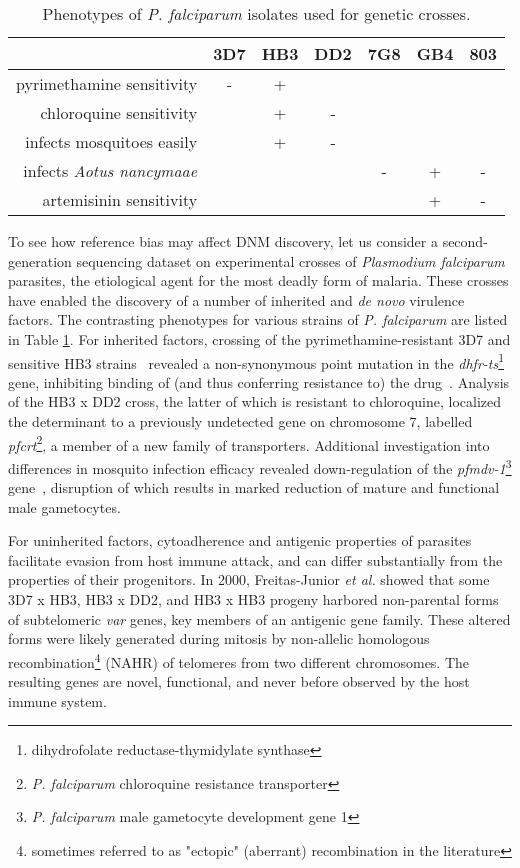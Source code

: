 \begin{table}[]
\centering
\caption{Phenotypes of \textit{P. falciparum} isolates used for genetic crosses.}
\label{tb:pf_phenotypes}
\begin{tabular}{@{}rcccccc@{}}
\toprule
                                 & 3D7 & HB3 & DD2 & 7G8 & GB4 & 803 \\
\midrule
pyrimethamine sensitivity        & -   & +   &     &     &     &     \\
chloroquine sensitivity          &     & +   & -   &     &     &     \\
infects mosquitoes easily        &     & +   & -   &     &     &     \\
infects \textit{Aotus nancymaae} &     &     &     & -   & +   & -   \\
artemisinin sensitivity          &     &     &     &     & +   & -   \\
\bottomrule
\end{tabular}
\end{table}

To see how reference bias may affect DNM discovery, let us consider a second-generation sequencing dataset on experimental crosses of \textit{Plasmodium falciparum} parasites, the etiological agent for the most deadly form of malaria.  These crosses have enabled the discovery of a number of inherited and \textit{de novo} virulence factors.  The contrasting phenotypes for various strains of \textit{P. falciparum} are listed in Table \ref{tb:pf_phenotypes}.  For inherited factors, crossing of the pyrimethamine-resistant 3D7 and sensitive HB3 strains~\cite{Walliker:1987cv} revealed a non-synonymous point mutation in the \textit{dhfr-ts}\footnote{dihydrofolate reductase-thymidylate synthase} gene, inhibiting binding of (and thus conferring resistance to) the drug~\cite{Peterson:1988wt}.  Analysis of the HB3 x DD2 cross\cite{Wellems:1990eg}, the latter of which is resistant to chloroquine, localized the determinant to a previously undetected gene on chromosome $7$, labelled \textit{pfcrt}\footnote{\textit{P. falciparum} chloroquine resistance transporter}, a member of a new family of transporters.  Additional investigation into differences in mosquito infection efficacy revealed down-regulation of the \textit{pfmdv-1}\footnote{\textit{P. falciparum} male gametocyte development gene 1} gene~\cite{Vaidya:1995up,Furuya:2005jn}, disruption of which results in marked reduction of mature and functional male gametocytes.

For uninherited factors, cytoadherence and antigenic properties of parasites facilitate evasion from host immune attack, and can differ substantially from the properties of their progenitors.  In 2000, Freitas-Junior \textit{et al.} showed that some 3D7 x HB3, HB3 x DD2, and HB3 x HB3 progeny harbored non-parental forms of subtelomeric \textit{var} genes, key members of an antigenic gene family\cite{FreitasJunior:2000cp}.  These altered forms were likely generated during mitosis by non-allelic homologous recombination\footnote{sometimes referred to as "ectopic" (aberrant) recombination in the literature} (NAHR) of telomeres from two different chromosomes\cite{Duffy:2009cc}.  The resulting genes are novel, functional, and never before observed by the host immune system.

